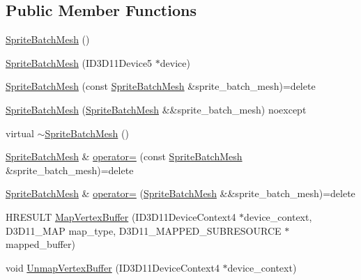 \subsection*{Public Member Functions}
\begin{DoxyCompactItemize}
\item 
\hyperlink{classmage_1_1_sprite_batch_mesh_ae5b2219aa3d5bbfb216036dad9c12e5d}{Sprite\+Batch\+Mesh} ()
\item 
\hyperlink{classmage_1_1_sprite_batch_mesh_a3df41f79eb6080be26acceb4d283a913}{Sprite\+Batch\+Mesh} (I\+D3\+D11\+Device5 $\ast$device)
\item 
\hyperlink{classmage_1_1_sprite_batch_mesh_af86adf72834bd4a8b5b55af3e91bd339}{Sprite\+Batch\+Mesh} (const \hyperlink{classmage_1_1_sprite_batch_mesh}{Sprite\+Batch\+Mesh} \&sprite\+\_\+batch\+\_\+mesh)=delete
\item 
\hyperlink{classmage_1_1_sprite_batch_mesh_aaeec56215da80e9f0fdcb0323acd5f90}{Sprite\+Batch\+Mesh} (\hyperlink{classmage_1_1_sprite_batch_mesh}{Sprite\+Batch\+Mesh} \&\&sprite\+\_\+batch\+\_\+mesh) noexcept
\item 
virtual \hyperlink{classmage_1_1_sprite_batch_mesh_a4f9ad5d0d58722499b9e7ddfac3312c9}{$\sim$\+Sprite\+Batch\+Mesh} ()
\item 
\hyperlink{classmage_1_1_sprite_batch_mesh}{Sprite\+Batch\+Mesh} \& \hyperlink{classmage_1_1_sprite_batch_mesh_ac6b9c2c79286f736d9a91a79cfa70044}{operator=} (const \hyperlink{classmage_1_1_sprite_batch_mesh}{Sprite\+Batch\+Mesh} \&sprite\+\_\+batch\+\_\+mesh)=delete
\item 
\hyperlink{classmage_1_1_sprite_batch_mesh}{Sprite\+Batch\+Mesh} \& \hyperlink{classmage_1_1_sprite_batch_mesh_a678700348ef43c46ed90d87d78c498de}{operator=} (\hyperlink{classmage_1_1_sprite_batch_mesh}{Sprite\+Batch\+Mesh} \&\&sprite\+\_\+batch\+\_\+mesh)=delete
\item 
H\+R\+E\+S\+U\+LT \hyperlink{classmage_1_1_sprite_batch_mesh_a9fcba5d0aaea05a12e30844824b0a484}{Map\+Vertex\+Buffer} (I\+D3\+D11\+Device\+Context4 $\ast$device\+\_\+context, D3\+D11\+\_\+\+M\+AP map\+\_\+type, D3\+D11\+\_\+\+M\+A\+P\+P\+E\+D\+\_\+\+S\+U\+B\+R\+E\+S\+O\+U\+R\+CE $\ast$mapped\+\_\+buffer)
\item 
void \hyperlink{classmage_1_1_sprite_batch_mesh_a70a8bb1be693a2d210d410e8df787c24}{Unmap\+Vertex\+Buffer} (I\+D3\+D11\+Device\+Context4 $\ast$device\+\_\+context)
\end{DoxyCompactItemize}
